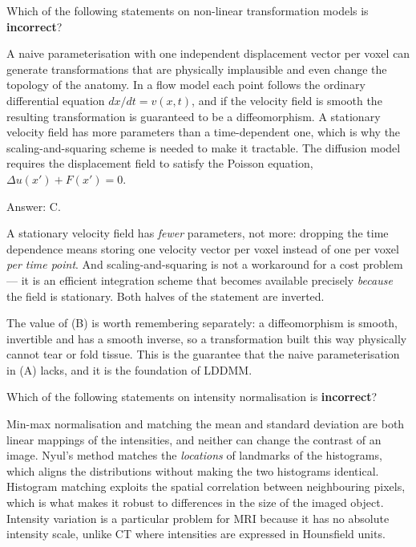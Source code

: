 \documentclass[11pt]{exam}
\begin{document}
\begin{questions}
\question
Which of the following statements on non-linear transformation models is \textbf{incorrect}?

\begin{choices}
  \choice A naive parameterisation with one independent displacement vector per voxel can generate
  transformations that are physically implausible and even change the topology of the anatomy.
  \choice In a flow model each point follows the ordinary differential equation
  $dx/dt = v(x,t)$, and if the velocity field is smooth the resulting transformation is guaranteed
  to be a diffeomorphism.
  \choice A stationary velocity field has more parameters than a time-dependent one, which is why
  the scaling-and-squaring scheme is needed to make it tractable.
  \choice The diffusion model requires the displacement field to satisfy the Poisson equation,
  $\Delta u(x') + F(x') = 0$.
\end{choices}

\begin{solution}
  Answer: C.

  A stationary velocity field has \emph{fewer} parameters, not more: dropping the time dependence
  means storing one velocity vector per voxel instead of one per voxel \emph{per time point}. And
  scaling-and-squaring is not a workaround for a cost problem --- it is an efficient integration
  scheme that becomes available precisely \emph{because} the field is stationary. Both halves of
  the statement are inverted.

  The value of (B) is worth remembering separately: a diffeomorphism is smooth, invertible and has
  a smooth inverse, so a transformation built this way physically cannot tear or fold tissue. This
  is the guarantee that the naive parameterisation in (A) lacks, and it is the foundation of LDDMM.
\end{solution}

\question
Which of the following statements on intensity normalisation is \textbf{incorrect}?

\begin{choices}
  \choice Min-max normalisation and matching the mean and standard deviation are both linear
  mappings of the intensities, and neither can change the contrast of an image.
  \choice Nyul's method matches the \emph{locations} of landmarks of the histograms, which aligns
  the distributions without making the two histograms identical.
  \choice Histogram matching exploits the spatial correlation between neighbouring pixels, which is
  what makes it robust to differences in the size of the imaged object.
  \choice Intensity variation is a particular problem for MRI because it has no absolute intensity
  scale, unlike CT where intensities are expressed in Hounsfield units.
\end{choices}


\end{questions}
\end{document}
